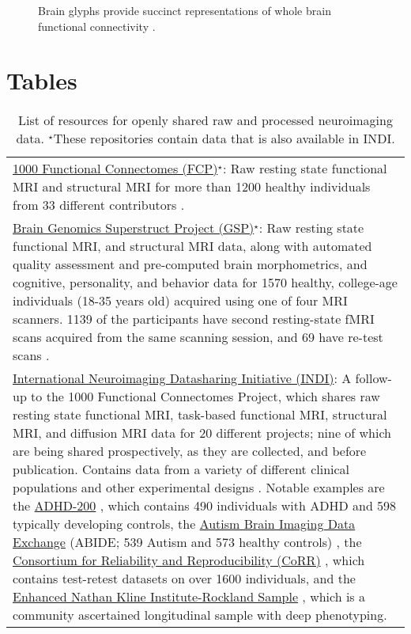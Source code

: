 \documentclass{bmcart}
\begin{document}
\begin{backmatter}
\begin{figure}[h!]
  \caption{\label{fig:neurophenotypes} Brain glyphs provide succinct representations of whole brain functional connectivity \cite{Bottger2014}. }
      \end{figure}
	  
\section*{Tables}

\renewcommand{\arraystretch}{1.5}

\begin{table}[h!]
\caption{List of resources for openly shared raw and processed neuroimaging data. $^{\star}$These repositories contain data that is also available in INDI.}
\label{Table1}
      \begin{tabular}{L{5.5in}}
        \hline
        \href{http://fcon_1000.projects.nitrc.org}{1000 Functional Connectomes (FCP)}$^{\star}$: Raw resting state functional MRI and structural MRI for more than 1200 healthy individuals from 33 different contributors \cite{Biswal2010}. \\ 
		\href{https://thedata.harvard.edu/dvn/dv/GSP}{Brain Genomics Superstruct Project (GSP)}$^{\star}$: Raw resting state functional MRI, and structural MRI data, along with automated quality assessment and pre-computed brain morphometrics, and cognitive, personality, and behavior data for 1570 healthy, college-age individuals (18-35 years old) acquired using one of four MRI scanners. 1139 of the participants have second resting-state fMRI scans acquired from the same scanning session, and 69 have re-test scans \cite{BucknerGSP2014}.\\
		\href{http://fcon_1000.projects.nitrc.org}{International Neuroimaging Datasharing Initiative (INDI)}: A follow-up to the 1000 Functional Connectomes Project, which shares raw resting state functional MRI, task-based functional MRI, structural MRI, and diffusion MRI data for 20 different projects; nine of which are being shared prospectively, as they are collected, and before publication. Contains data from a variety of different clinical populations and other experimental designs \cite{Mennes2013}. Notable examples are the \href{http://fcon_1000.projects.nitrc.org/indi/adhd200}{ADHD-200} \cite{Milham2012adhd}, which contains 490 individuals with ADHD and 598 typically developing controls, the \href{http://fcon_1000.projects.nitrc.org/indi/abide}{Autism Brain Imaging Data Exchange} (ABIDE; 539 Autism and 573 healthy controls) \cite{DiMartino2014}, the \href{http://fcon_1000.projects.nitrc.org/indi/CoRR/html/}{Consortium for Reliability and Reproducibility (CoRR)} \cite{Zuo2014}, which contains test-retest datasets on over 1600 individuals, and the \href{http://fcon_1000.projects.nitrc.org/indi/enhanced/}{Enhanced Nathan Kline Institute-Rockland Sample} \cite{Nooner2012}, which is a community ascertained longitudinal sample with deep phenotyping. \\

\end{tabular}
\end{table}
\end{backmatter}
\end{document}
